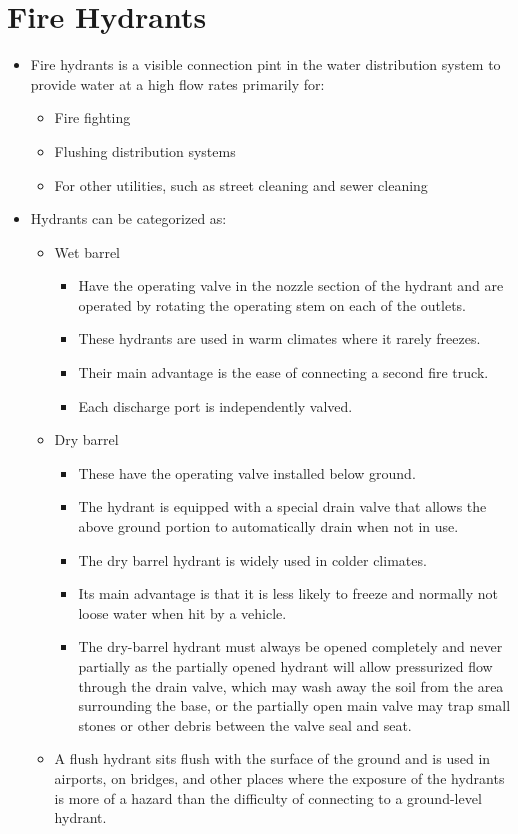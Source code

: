 \section{Fire Hydrants}
\begin{itemize}
\item Fire hydrants is a visible connection pint in the water distribution system to provide water at a high flow rates primarily for:
\begin{itemize}
\item Fire fighting
\item  Flushing distribution systems
\item For other utilities, such as street cleaning and sewer cleaning
\end{itemize}
\item Hydrants can be categorized as:
\begin{itemize}
\item Wet barrel 
\begin{itemize}
\item Have the operating valve in the nozzle section
of the hydrant and are operated by rotating the operating stem on each of the outlets.
\item These hydrants are used in warm climates where it rarely freezes.
\item Their main advantage is the ease of connecting a second fire truck. 
\item Each discharge port is independently valved.
\end{itemize}
\item Dry barrel 
\begin{itemize}
\item These have the operating valve installed below
ground.
\item The hydrant is equipped with a special drain valve that allows the above ground portion to automatically drain when not in use. 
\item The dry barrel
hydrant is widely used in colder climates. 
\item Its main advantage is that it is less
likely to freeze and normally not loose water when hit by a vehicle.
\item The dry-barrel hydrant must always be opened completely and never partially as the partially opened hydrant will allow pressurized flow through the drain valve, which may wash away the soil from the area surrounding the base, or the partially open main valve may trap small stones or other debris between the valve seal and seat.
\end{itemize}
\item A flush hydrant sits flush with the
surface of the ground and is used in airports, on bridges, and other places where the exposure of the hydrants is more of a hazard than the difficulty of connecting to a ground-level hydrant. 
\end{itemize}
\newpage
\end{itemize}
